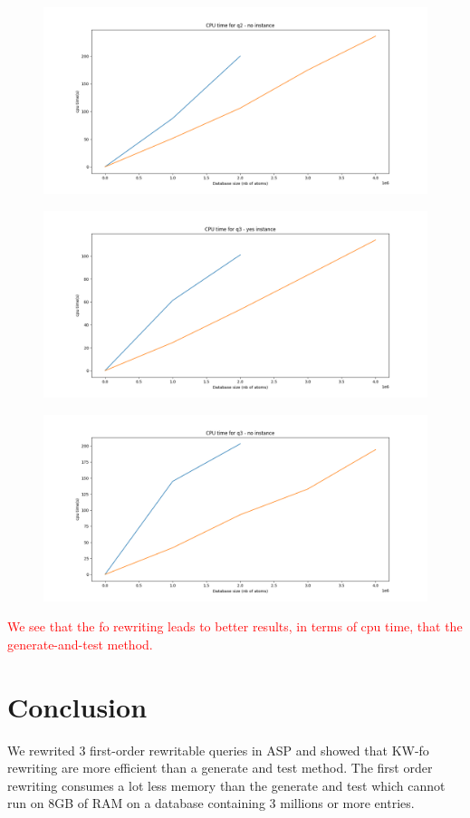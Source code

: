 \begin{figure}[H]
\includegraphics[width=\textwidth]{time_q2_noinstance.png}
\centering
\end{figure}

\begin{figure}[H]
\includegraphics[width=\textwidth]{time_q3_yesinstance.png}
\centering
\end{figure}

\begin{figure}[H]
\includegraphics[width=\textwidth]{time_q3_noinstance.png}
\centering
\end{figure}

\textcolor{red}{We see that the fo rewriting leads to better results, in terms of cpu time, that the generate-and-test method.}

\section{Conclusion}

We rewrited 3 first-order rewritable queries in ASP and showed that KW-fo rewriting are more efficient than a generate and test method. The first order rewriting consumes a lot less memory than the generate and test which cannot run on 8GB of RAM on a database containing 3 millions or more entries.

